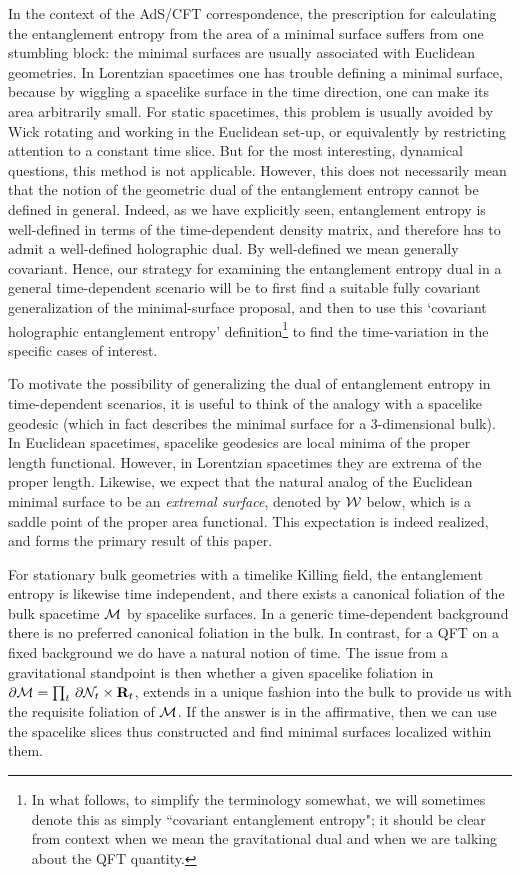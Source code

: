 \documentclass[12pt]{article}
\def\p{\partial}
\def\CW{{\cal W}}
\def\R{{\bf R}}
\def\p{\partial}
\def\p{\partial}
\def\bulk{{\cal M}}
\def\bdy{\p{\cal M}}
\def\bdys{\p{\cal N}}
\def\Gms{\CW}
\begin{document}
In the context of the AdS/CFT correspondence, the prescription for
calculating the entanglement entropy from the  area of a minimal
surface  suffers from one stumbling block: the minimal surfaces  are
usually associated with Euclidean geometries. In Lorentzian
spacetimes one has trouble defining  a minimal surface, because by
wiggling a spacelike surface in the time direction, one can make its
area arbitrarily small.  For static spacetimes, this problem is
usually avoided by Wick rotating and working  in the Euclidean
set-up, or equivalently by restricting attention to a constant time
slice.  But for the  most interesting, dynamical questions, this
method is not applicable. However, this does not necessarily mean
that the notion of the geometric dual of the entanglement entropy
cannot be defined in general. Indeed, as we have explicitly seen,
entanglement entropy is well-defined in terms of the time-dependent
density matrix, and therefore has to admit a well-defined
holographic dual.  By well-defined we mean generally covariant.
Hence, our strategy for examining the entanglement entropy dual in a
general time-dependent scenario will be to first find a suitable
fully covariant generalization of the minimal-surface proposal, and
then to use this `covariant holographic entanglement entropy'
definition\footnote{ In what follows, to simplify the terminology
somewhat, we will sometimes denote this as simply ``covariant
entanglement entropy"; it should be clear from context when we mean
the gravitational dual and when we are talking about the QFT
quantity. } to find the time-variation in the specific cases of
interest.

 To motivate the possibility of generalizing the dual of entanglement entropy in time-dependent scenarios,
  it is useful to think of the analogy with a spacelike geodesic
 (which in fact describes the minimal surface for a 3-dimensional bulk).  In Euclidean
 spacetimes, spacelike geodesics are local minima of the proper length functional. However,
 in Lorentzian spacetimes they are extrema of the proper length. Likewise, we expect that the
  natural analog of the Euclidean minimal surface to be an {\it extremal surface}, denoted by
   $\Gms$ below, which is a saddle point of the proper area
   functional. This expectation is indeed realized, and forms the primary result of this paper.

For stationary bulk geometries with a timelike Killing field, the entanglement entropy is likewise time independent,  and there exists a canonical foliation of the bulk spacetime $\bulk$ by spacelike surfaces. In a generic time-dependent background there is no preferred canonical foliation in the bulk. In contrast, for a QFT on a fixed background we do have a natural notion of time.  The issue from a gravitational standpoint is then whether a given  spacelike foliation in  $\bdy = \prod_t\, \bdys_t \times \R_t$, extends in a unique fashion into the bulk to provide us with the requisite foliation of $\bulk$. If the answer is in the
 affirmative, then we can use the spacelike slices thus constructed and find minimal surfaces
 localized  within them.
\end{document}
